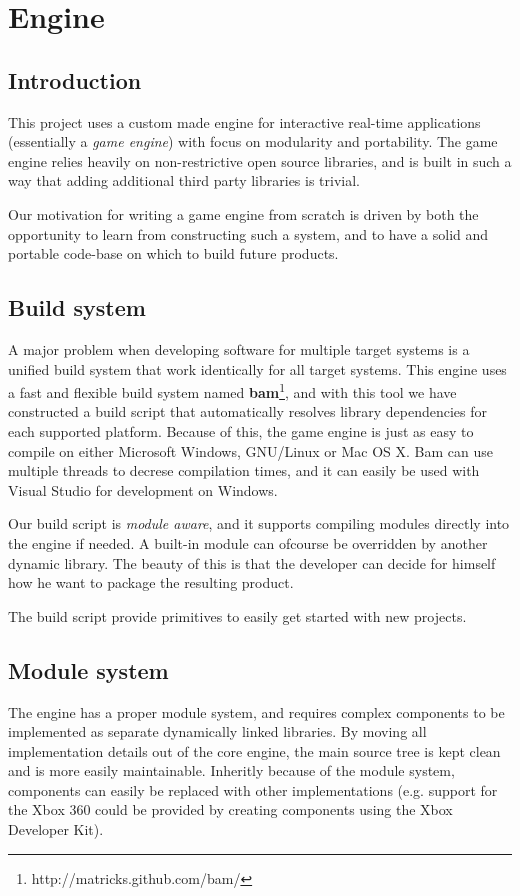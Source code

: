 
\chapter{Engine}
\section {Introduction}
This project uses a custom made engine for interactive real-time applications (essentially a \textit{game engine}) with focus on modularity and portability. The game engine relies heavily on non-restrictive open source libraries, and is built in such a way that adding additional third party libraries is trivial.

Our motivation for writing a game engine from scratch is driven by both the opportunity to learn from
constructing such a system, and to have a solid and portable code-base on which to build future products.

\section {Build system}
A major problem when developing software for multiple target systems is a unified build system that work
identically for all target systems. This engine uses a fast and flexible build system named \textbf{bam}\footnote{http://matricks.github.com/bam/}, and
with this tool we have constructed a build script that automatically resolves library dependencies for each supported platform. Because of this, the game engine is just as easy to compile on either Microsoft Windows, GNU/Linux or Mac OS X. Bam can use multiple threads to decrese compilation times, and it can easily be used with Visual Studio for development on Windows.

Our build script is \textit{module aware}, and it supports compiling modules directly into the engine if needed. A built-in module can ofcourse be overridden by another dynamic library. The beauty of this is that the developer can decide for himself how he want to package the resulting product.

The build script provide primitives to easily get started with new projects. 

\newpage

\section{Module system}
The engine has a proper module system, and requires complex components to be implemented as separate dynamically linked libraries. By moving all implementation details out of the core engine, the main source tree is kept clean and is more easily maintainable. Inheritly because of the module system, components can easily be replaced with other implementations (e.g. support for the Xbox 360 could be provided
by creating components using the Xbox Developer Kit).

